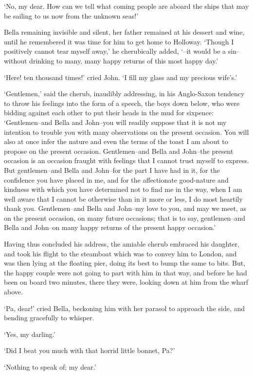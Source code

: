 ‘No, my dear. How can we tell what coming people are aboard the ships
that may be sailing to us now from the unknown seas!’

Bella remaining invisible and silent, her father remained at his
dessert and wine, until he remembered it was time for him to get home to
Holloway. ‘Though I positively cannot tear myself away,’ he cherubically
added, ‘--it would be a sin--without drinking to many, many happy
returns of this most happy day.’

‘Here! ten thousand times!’ cried John. ‘I fill my glass and my precious
wife’s.’

‘Gentlemen,’ said the cherub, inaudibly addressing, in his Anglo-Saxon
tendency to throw his feelings into the form of a speech, the boys down
below, who were bidding against each other to put their heads in the mud
for sixpence: ‘Gentlemen--and Bella and John--you will readily suppose
that it is not my intention to trouble you with many observations on the
present occasion. You will also at once infer the nature and even
the terms of the toast I am about to propose on the present occasion.
Gentlemen--and Bella and John--the present occasion is an occasion
fraught with feelings that I cannot trust myself to express. But
gentlemen--and Bella and John--for the part I have had in it, for the
confidence you have placed in me, and for the affectionate good-nature
and kindness with which you have determined not to find me in the way,
when I am well aware that I cannot be otherwise than in it more or less,
I do most heartily thank you. Gentlemen--and Bella and John--my love
to you, and may we meet, as on the present occasion, on many future
occasions; that is to say, gentlemen--and Bella and John--on many happy
returns of the present happy occasion.’

Having thus concluded his address, the amiable cherub embraced his
daughter, and took his flight to the steamboat which was to convey him
to London, and was then lying at the floating pier, doing its best to
bump the same to bits. But, the happy couple were not going to part with
him in that way, and before he had been on board two minutes, there they
were, looking down at him from the wharf above.

‘Pa, dear!’ cried Bella, beckoning him with her parasol to approach the
side, and bending gracefully to whisper.

‘Yes, my darling.’

‘Did I beat you much with that horrid little bonnet, Pa?’

‘Nothing to speak of; my dear.’

